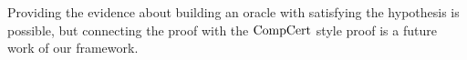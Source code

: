 Providing the evidence about building an oracle with satisfying the hypothesis is possible, 
but connecting the proof with the $\mathrm{CompCert}$ style proof is a future work of our framework. 

%
